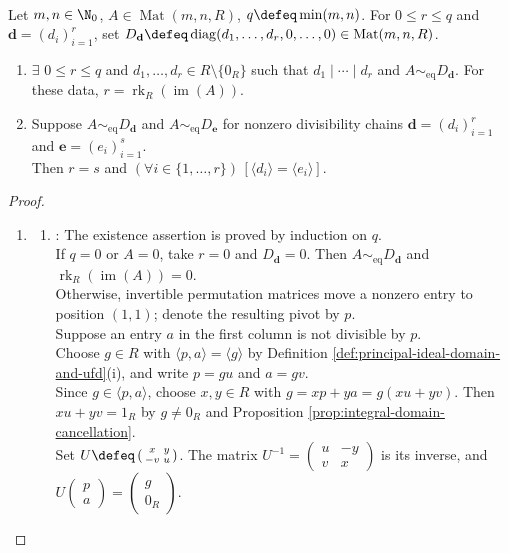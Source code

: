 \begin{theorem} \label{thm:smith-normal-form-over-pid} \\
Let $m,n\in\N_0$, $A\in\operatorname{Mat}(m,n,R)$, $q\defeq\min(m,n)$. For $0\leq r\leq q$ and $\mathbf{d}=(d_i)_{i=1}^r$, set $D_{\mathbf{d}}\defeq\operatorname{diag}(d_1,\ldots,d_r,0,\ldots,0)\in\operatorname{Mat}(m,n,R)$.
\begin{enumerate}[label=(\roman*)]
\setlength{\itemsep}{0pt}
\item $\exists$ $0\leq r\leq q$ and $d_1,\ldots,d_r\in R\setminus\{0_R\}$ such that $d_1\mid\cdots\mid d_r$ and $A\sim_{\mathrm{eq}}D_{\mathbf{d}}$. For these data, $r=\operatorname{rk}_R(\operatorname{im}(A))$.
\item Suppose $A\sim_{\mathrm{eq}}D_{\mathbf{d}}$ and $A\sim_{\mathrm{eq}}D_{\mathbf{e}}$ for nonzero divisibility chains $\mathbf{d}=(d_i)_{i=1}^r$ and $\mathbf{e}=(e_i)_{i=1}^s$.\\
Then $r=s$ and $(\forall i\in\{1,\ldots,r\})\,[\langle d_i\rangle=\langle e_i\rangle]$.
\end{enumerate}
\begin{proof}
\begin{enumerate}[label=(\roman*)]
\setlength{\itemsep}{0pt}
\item
\begin{enumerate}[label=(\alph*)]
\setlength{\itemsep}{0pt}
\item {}: The existence assertion is proved by induction on $q$.\\
If $q=0$ or $A=0$, take $r=0$ and $D_{\mathbf{d}}=0$. Then $A\sim_{\mathrm{eq}}D_{\mathbf{d}}$ and $\operatorname{rk}_R(\operatorname{im}(A))=0$.\\
Otherwise, invertible permutation matrices move a nonzero entry to position $(1,1)$; denote the resulting pivot by $p$.\\
Suppose an entry $a$ in the first column is not divisible by $p$.\\
Choose $g\in R$ with $\langle p,a\rangle=\langle g\rangle$ by Definition \ref{def:principal-ideal-domain-and-ufd}(i), and write $p=gu$ and $a=gv$.\\
Since $g\in\langle p,a\rangle$, choose $x,y\in R$ with $g=xp+ya=g(xu+yv)$. Then $xu+yv=1_R$ by $g\neq0_R$ and Proposition \ref{prop:integral-domain-cancellation}.\\
Set $U\defeq\left(\begin{smallmatrix}x&y\\-v&u\end{smallmatrix}\right)$. The matrix $U^{-1}=\left(\begin{smallmatrix}u&-y\\v&x\end{smallmatrix}\right)$ is its inverse, and $U\left(\begin{smallmatrix}p\\a\end{smallmatrix}\right)=\left(\begin{smallmatrix}g\\0_R\end{smallmatrix}\right)$.\\

\end{enumerate}
\end{enumerate}
\end{proof}
\end{theorem}
